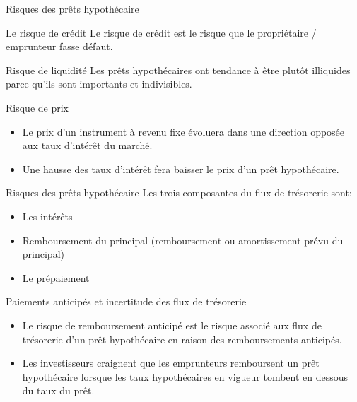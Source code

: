 \documentclass[10pt,a4paper]{beamer}
\begin{document}
\begin{frame}{Risques des prêts hypothécaire}
\begin{block}{Le risque de crédit}
Le risque de crédit est le risque que le propriétaire / emprunteur fasse défaut. 
\end{block}
\begin{block}{Risque de liquidité}
Les prêts hypothécaires ont tendance à être plutôt illiquides parce qu'ils sont importants et indivisibles.
\end{block}
\begin{block}{Risque de prix}
\begin{itemize}[label=\bullet]
\item Le prix d'un instrument à revenu fixe évoluera dans une direction opposée aux taux d'intérêt du marché. 
\item Une hausse des taux d'intérêt fera baisser le prix d'un prêt hypothécaire.
\end{itemize}
\end{block}
\end{frame}


\begin{frame}{Risques des prêts hypothécaire}
Les trois composantes du flux de trésorerie sont: 
\begin{itemize}[label=\bullet]
\item Les intérêts
\item Remboursement du principal (remboursement ou amortissement prévu du principal)
\item Le prépaiement
\end{itemize}

\begin{block}{Paiements anticipés et incertitude des flux de trésorerie}
\begin{itemize}[label=\bullet]
\item Le risque de remboursement anticipé est le risque associé aux flux de trésorerie d’un prêt hypothécaire en raison des remboursements anticipés.
\item Les investisseurs craignent que les emprunteurs remboursent un prêt hypothécaire lorsque les taux hypothécaires en vigueur tombent en dessous du taux du prêt.
\end{itemize}
\end{block}
\end{frame}
\end{document}

